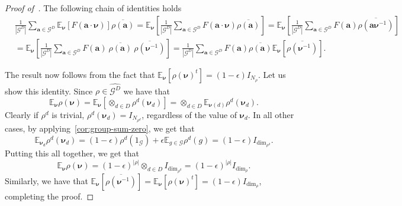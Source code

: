 \documentclass[a4paper,11pt]{article}
\theoremstyle{definition}
\newcommand{\ex}[1]{\mathbb{E}_{#1}}
\newcommand{\gr}{\mathscr{G}}
\newcommand{\ba}{\mathbf{a}}
\newcommand{\groupid}{1}
\newcommand{\tsp}[1]{{#1}^{t}}
\begin{document}
\begin{proof}[Proof of~]
The following chain of identities holds
\begin{align*}
& \frac{1}{|\gr^D|}   \sum_{\ba\in \gr^D} \ex{\bm{\nu}}\left[
F(\ba\cdot\bm{\nu})\right]\overline{\rho(\ba)}
  =  \ex{\bm{\nu}}\left[ \frac{1}{|\gr^D|}  \sum_{\ba\in \gr^D}
F(\ba\cdot\bm{\nu}) \overline{\rho(\ba)} \right] 
=  \ex{\bm{\nu}}\left[ \frac{1}{|\gr^D|}  \sum_{\ba\in \gr^D}
F(\ba) \overline{\rho(\ba \bm{\nu}^{-1})} \right] \\
& = \ex{\bm{\nu}}\left[ \frac{1}{|\gr^D|}  \sum_{\ba\in \gr^D}
F(\ba) \ \overline{\rho(\ba)} 
\ \overline{\rho(\bm{\nu}^{-1})}
\right] 
= \frac{1}{|\gr^D|} \sum_{\ba\in \gr^D} F(\ba)
\overline{\rho(\ba)} \ex{\bm{\nu}}[\overline{\rho(\bm{\nu}^{-1})}] .
\end{align*}

The result now follows from the fact that $\ex{\bm{\nu}}[\tsp{\rho(\bm{\nu})}]=(1-\epsilon)I_{N_{\rho}}$. Let us show this identity. 
  Since $\rho \in \widehat{\gr^D}$ we have that \[\ex{\bm{\nu}} \rho(\bm{\nu}) =
  \ex{\bm{\nu}} \left[ \otimes_{d\in D}\rho^d(\bm{\nu}_d) \right] =
  \otimes_{d\in D} \ex{\bm{\nu}(d)} \rho^d(\bm{\nu}_d).\]
%
Clearly if $\rho^d$ is trivial, $\rho^d(\bm{\nu}_d)=I_{N_{\rho^d}}$, regardless
  of the value of $\bm{\nu}_d$. In all other cases, by
  applying~\cref{cor:group-sum-zero}, we get that \[\ex{\bm{\nu}_d}
  \rho^d(\bm{\nu}_d)=(1-\epsilon)\rho^d(\groupid_{\gr}) + \epsilon \ex{g \in
  \gr}\rho^d(g) = (1-\epsilon)I_{\dim_{\rho^d}}.\]
  Putting this all together, we get that \[\ex{\bm{\nu}} \rho(\bm{\nu}) =
  (1-\epsilon)^{|\rho|}\otimes_{d\in D} I_{\dim_{\rho^d}} =
  (1-\epsilon)^{|\rho|}I_{\dim_{\rho}}.\]
Similarly, we have that $\ex{\bm{\nu}}[\overline{\rho(\bm{\nu}^{-1})}]=
\ex{\bm{\nu}}[\tsp{\rho(\bm{\nu})}]=(1-\epsilon)I_{\dim_{\rho}}$, completing the proof.
%
\end{proof}



\end{document}
